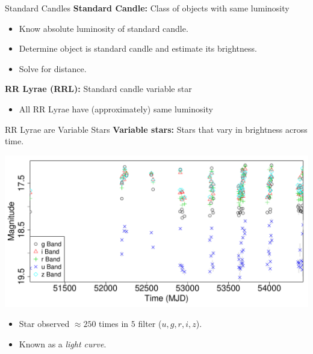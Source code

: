 \documentclass[12pt]{beamer}
\begin{document}
\begin{frame}{Standard Candles}
  \textbf{Standard Candle:} Class of objects with same luminosity
  \begin{itemize}
  \item Know absolute luminosity of standard candle.
  \item Determine object is standard candle and estimate its brightness.
  \item Solve for distance.
  \end{itemize}

  \vspace{.3in}
  
  \textbf{RR Lyrae (RRL):} Standard candle variable star
  \begin{itemize}
  \item All RR Lyrae have (approximately) same luminosity
  \end{itemize}
\end{frame}

\begin{frame}{RR Lyrae are Variable Stars}
\textbf{Variable stars:} Stars that vary in brightness across time.
\begin{center}
\includegraphics[scale=.3]{figs/unfolded_13350.pdf}
\end{center}


  \begin{itemize}
    \item Star observed $\approx 250$ times in $5$ filter ($u,g,r,i,z$).
    \item Known as a \textit{light curve}.
  \end{itemize}

\end{frame}
\end{document}

